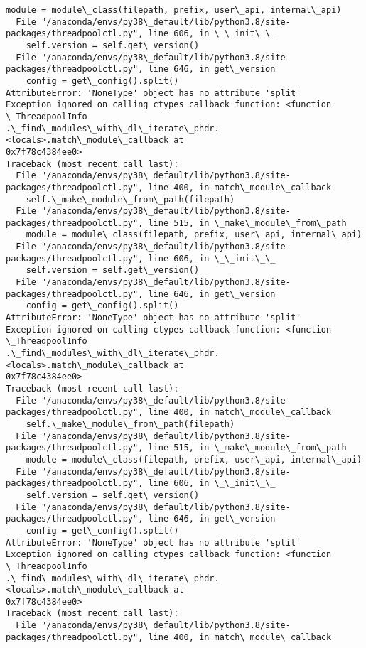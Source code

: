 \documentclass[11pt]{article}
\begin{document}
\begin{Verbatim}[commandchars=\\\{\}]
    module = module\_class(filepath, prefix, user\_api, internal\_api)
  File "/anaconda/envs/py38\_default/lib/python3.8/site-
packages/threadpoolctl.py", line 606, in \_\_init\_\_
    self.version = self.get\_version()
  File "/anaconda/envs/py38\_default/lib/python3.8/site-
packages/threadpoolctl.py", line 646, in get\_version
    config = get\_config().split()
AttributeError: 'NoneType' object has no attribute 'split'
Exception ignored on calling ctypes callback function: <function \_ThreadpoolInfo
.\_find\_modules\_with\_dl\_iterate\_phdr.<locals>.match\_module\_callback at
0x7f78c4384ee0>
Traceback (most recent call last):
  File "/anaconda/envs/py38\_default/lib/python3.8/site-
packages/threadpoolctl.py", line 400, in match\_module\_callback
    self.\_make\_module\_from\_path(filepath)
  File "/anaconda/envs/py38\_default/lib/python3.8/site-
packages/threadpoolctl.py", line 515, in \_make\_module\_from\_path
    module = module\_class(filepath, prefix, user\_api, internal\_api)
  File "/anaconda/envs/py38\_default/lib/python3.8/site-
packages/threadpoolctl.py", line 606, in \_\_init\_\_
    self.version = self.get\_version()
  File "/anaconda/envs/py38\_default/lib/python3.8/site-
packages/threadpoolctl.py", line 646, in get\_version
    config = get\_config().split()
AttributeError: 'NoneType' object has no attribute 'split'
Exception ignored on calling ctypes callback function: <function \_ThreadpoolInfo
.\_find\_modules\_with\_dl\_iterate\_phdr.<locals>.match\_module\_callback at
0x7f78c4384ee0>
Traceback (most recent call last):
  File "/anaconda/envs/py38\_default/lib/python3.8/site-
packages/threadpoolctl.py", line 400, in match\_module\_callback
    self.\_make\_module\_from\_path(filepath)
  File "/anaconda/envs/py38\_default/lib/python3.8/site-
packages/threadpoolctl.py", line 515, in \_make\_module\_from\_path
    module = module\_class(filepath, prefix, user\_api, internal\_api)
  File "/anaconda/envs/py38\_default/lib/python3.8/site-
packages/threadpoolctl.py", line 606, in \_\_init\_\_
    self.version = self.get\_version()
  File "/anaconda/envs/py38\_default/lib/python3.8/site-
packages/threadpoolctl.py", line 646, in get\_version
    config = get\_config().split()
AttributeError: 'NoneType' object has no attribute 'split'
Exception ignored on calling ctypes callback function: <function \_ThreadpoolInfo
.\_find\_modules\_with\_dl\_iterate\_phdr.<locals>.match\_module\_callback at
0x7f78c4384ee0>
Traceback (most recent call last):
  File "/anaconda/envs/py38\_default/lib/python3.8/site-
packages/threadpoolctl.py", line 400, in match\_module\_callback

\end{Verbatim}
\end{document}

